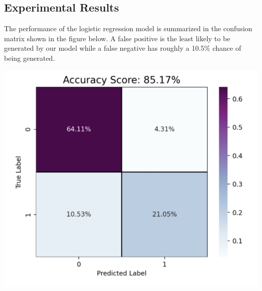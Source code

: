 \documentclass{article}
\begin{document}
\subsection*{Experimental Results}

\quad The performance of the logistic regression model is summarized in the confusion matrix shown in the figure below. A false positive is the least likely to be generated by our model while a false negative has roughly a 10.5\% chance of being generated. 

\begin{center}
\includegraphics[scale=.65]{confusion_matrix.png}\\
\end{center}
\end{document}
